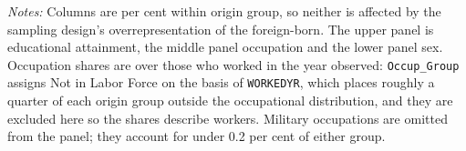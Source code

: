 \begin{table}[!htbp]
\centering
\caption{Mexican-Born Immigrants Against All Other Origins, Ages 25 and Over}
\label{tab:mexico_vs_other}
\begin{minipage}{\textwidth}
\footnotesize
\vspace{4pt}
\textit{Notes:} Columns are per cent within origin group, so neither is affected by the sampling design's overrepresentation of the foreign-born. The upper panel is educational attainment, the middle panel occupation and the lower panel sex. Occupation shares are over those who worked in the year observed: \texttt{Occup\_Group} assigns Not in Labor Force on the basis of \texttt{WORKEDYR}, which places roughly a quarter of each origin group outside the occupational distribution, and they are excluded here so the shares describe workers. Military occupations are omitted from the panel; they account for under 0.2 per cent of either group.
\end{minipage}
\end{table}

